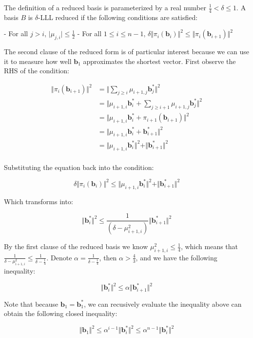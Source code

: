 \documentclass[letterpaper,12pt]{article}
\begin{document}
The definition of a reduced basis is parameterized by a real number $\frac{1}{4} < \delta \leq 1$. A basis $B$ is $\delta$-LLL reduced if the following conditions are satisfied:

- For all $j > i$, $\vert\mu_{j, i}\vert \leq \frac{1}{2}$
- For all $1 \leq i \leq n-1$, $\delta\Vert \pi_i(\mathbf{b}_i)\Vert^2 \leq \Vert\pi_i(\mathbf{b}_{i+1})\Vert^2$

The second clause of the reduced form is of particular interest because we can use it to measure how well $\mathbf{b}_1$ approximates the shortest vector. First observe the RHS of the condition:

$$
\begin{aligned}
\Vert \pi_i(\mathbf{b}_{i+1})\Vert^2 &= \Vert \sum_{j\geq i}\mu_{i+1, j}\mathbf{b}_j^\ast\Vert^2 \\
&= \Vert \mu_{i+1, i}\mathbf{b}_i^\ast + \sum_{j\geq i+1}\mu_{i+1, j}\mathbf{b}_j^\ast\Vert^2 \\
&= \Vert \mu_{i+1, i}\mathbf{b}_i^\ast + \pi_{i+1}(\mathbf{b}_{i+1}) \Vert^2 \\
&= \Vert \mu_{i+1, i}\mathbf{b}_i^\ast + \mathbf{b}_{i+1}^\ast \Vert^2 \\
&= \Vert \mu_{i+1, i}\mathbf{b}_i^\ast \Vert^2 + \Vert \mathbf{b}_{i+1}^\ast \Vert^2 \\
\end{aligned}
$$

Substituting the equation back into the condition:

$$
\delta\Vert \pi_i(\mathbf{b}_i)\Vert^2 \leq \Vert \mu_{i+1, i}\mathbf{b}_i^\ast \Vert^2 + \Vert \mathbf{b}_{i+1}^\ast \Vert^2
$$

Which transforms into:

$$
\Vert \mathbf{b}_i^\ast \Vert^2 \leq \frac{1}{(\delta - \mu_{i+1, i}^2)} \Vert \mathbf{b}_{i+1}^\ast \Vert^2
$$

By the first clause of the reduced basis we know $\mu_{i+1, i}^2 \leq \frac{1}{4}$, which means that $\frac{1}{\delta - \mu_{i+1, i}^2} \leq \frac{1}{\delta - \frac{1}{4}}$. Denote $\alpha = \frac{1}{\delta - \frac{1}{4}}$, then $\alpha > \frac{4}{3}$, and we have the following inequality:

$$
\Vert \mathbf{b}_i^\ast \Vert^2 \leq \alpha \Vert \mathbf{b}_{i+1}^\ast \Vert^2
$$

Note that because $\mathbf{b}_1 = \mathbf{b}_1^\ast$, we can recusively evaluate the inequality above can obtain the following closed inequality:

$$
\Vert \mathbf{b}_1 \Vert^2 \leq \alpha^{i-1} \Vert \mathbf{b}_{i}^\ast \Vert^2 \leq \alpha^{n-1} \Vert \mathbf{b}_{i}^\ast \Vert^2
$$
\end{document}
